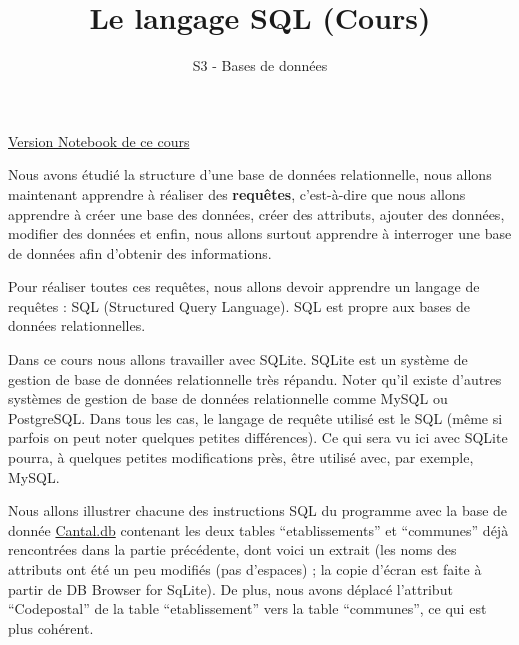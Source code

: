\documentclass[
  a4paper,
  DIV=11,
  numbers=noendperiod]{scrartcl}
\title{Le langage SQL (Cours)}
\subtitle{S3 - Bases de données}
\author{}
\date{}
\begin{document}
\maketitle
{}  \chead{} \cfoot{}   \renewcommand{\headrulewidth}{0pt} \renewcommand{\footrulewidth}{0pt} \thispagestyle{fancy} \vspace{-3cm}

\ifdefined\Shaded\renewenvironment{Shaded}{\begin{tcolorbox}[interior hidden, sharp corners, boxrule=0pt, enhanced, frame hidden, borderline west={3pt}{0pt}{shadecolor}, breakable]}{\end{tcolorbox}}\fi

\href{https://flallemand.fr/notebook/?kernel=sql\&extensions=admonitions\&module=https://flallemand.fr/nsi/assets/BDD/Cantal.db\&from=https://flallemand.fr/nsi/assets/notebooks/cours_SQL.ipynb}{Version
Notebook de ce cours}

Nous avons étudié la structure d'une base de données relationnelle, nous
allons maintenant apprendre à réaliser des \textbf{requêtes},
c'est-à-dire que nous allons apprendre à créer une base des données,
créer des attributs, ajouter des données, modifier des données et enfin,
nous allons surtout apprendre à interroger une base de données afin
d'obtenir des informations.

Pour réaliser toutes ces requêtes, nous allons devoir apprendre un
langage de requêtes : SQL (Structured Query Language). SQL est propre
aux bases de données relationnelles.

Dans ce cours nous allons travailler avec SQLite. SQLite est un système
de gestion de base de données relationnelle très répandu. Noter qu'il
existe d'autres systèmes de gestion de base de données relationnelle
comme MySQL ou PostgreSQL. Dans tous les cas, le langage de requête
utilisé est le SQL (même si parfois on peut noter quelques petites
différences). Ce qui sera vu ici avec SQLite pourra, à quelques petites
modifications près, être utilisé avec, par exemple, MySQL.

Nous allons illustrer chacune des instructions SQL du programme avec la
base de donnée \url{Cantal.db} contenant les deux tables
``etablissements'' et ``communes'' déjà rencontrées dans la partie
précédente, dont voici un extrait (les noms des attributs ont été un peu
modifiés (pas d'espaces) ; la copie d'écran est faite à partir de DB
Browser for SqLite). De plus, nous avons déplacé l'attribut
``Codepostal'' de la table ``etablissement'' vers la table ``communes'',
ce qui est plus cohérent.
\end{document}
